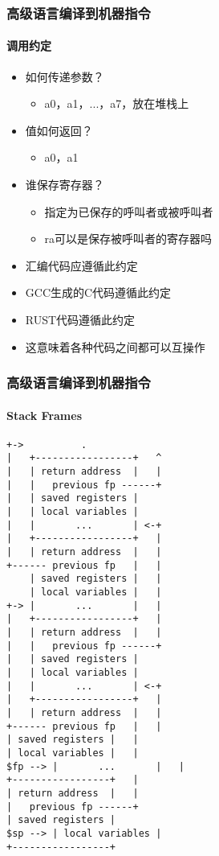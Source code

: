 \begin{frame}
	\frametitle{高级语言编译到机器指令}
\framesubtitle{调用约定}
	
 \begin{itemize}
	\item 如何传递参数？
	\begin{itemize}
	 	\item a0，a1，...，a7，放在堆栈上
	\end{itemize}
	\item 值如何返回？
	\begin{itemize}
		\item a0，a1
	\end{itemize}	
	\item 谁保存寄存器？
	\begin{itemize}
		\item 指定为已保存的呼叫者或被呼叫者
	    \item ra可以是保存被呼叫者的寄存器吗
    \end{itemize}   
	
	\item 汇编代码应遵循此约定
	\item GCC生成的C代码遵循此约定
	\item RUST代码遵循此约定
	\item 这意味着各种代码之间都可以互操作

\end{itemize} 
	
\end{frame}


\begin{frame}[fragile]
	\frametitle{高级语言编译到机器指令}
	\framesubtitle{Stack Frames}

\begin{lstlisting}
+->          .
|   +-----------------+   ^
|   | return address  |   |
|   |   previous fp ------+
|   | saved registers |
|   | local variables |
|   |       ...       | <-+
|   +-----------------+   |
|   | return address  |   |
+------ previous fp   |   |
    | saved registers |   |
    | local variables |   |
+-> |       ...       |   |
|   +-----------------+   |
|   | return address  |   |
|   |   previous fp ------+
|   | saved registers |
|   | local variables |
|   |       ...       | <-+
|   +-----------------+   |
|   | return address  |   |
+------ previous fp   |   |
| saved registers |   |
| local variables |   |
$fp --> |       ...       |   |
+-----------------+   |
| return address  |   |
|   previous fp ------+
| saved registers |
$sp --> | local variables |
+-----------------+
\end{lstlisting}	
	
	
\end{frame}



